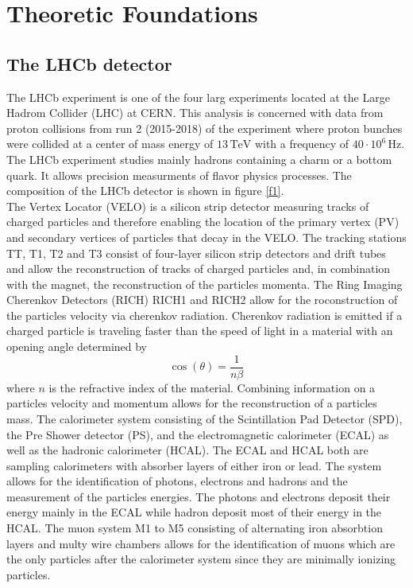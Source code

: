 \section{Theoretic Foundations}
\label{sec:Theorie}

\subsection{The LHCb detector}

The LHCb experiment is one of the four larg experiments located at the Large Hadrom Collider (LHC) at CERN. 
This analysis is concerned with data from proton collisions from run 2 (2015-2018) of the experiment where proton bunches were collided at 
a center of mass energy of $13 \, \si{\tera\eV}$ with a frequency of $40 \cdot 10^6 \, \si{\hertz}$. The LHCb experiment studies mainly hadrons 
containing a charm or a bottom quark. It allows precision measurments of flavor physics processes. 
The composition of the LHCb detector is shown in figure \ref{f1}. \\
The Vertex Locator (VELO) is a silicon strip detector measuring tracks of charged particles and therefore enabling the location of the 
primary vertex (PV) and secondary vertices of particles that decay in the VELO. The tracking stations TT, T1, T2 and T3 consist of four-layer silicon 
strip detectors and drift tubes and allow the reconstruction of tracks of charged particles and, in combination with the magnet, the reconstruction of the 
particles momenta.
The Ring Imaging Cherenkov Detectors (RICH) RICH1 and RICH2 allow for the roconstruction of the particles velocity via cherenkov radiation. 
Cherenkov radiation is emitted if a charged particle is traveling faster than the speed of light in a material with an opening angle determined by 
\begin{equation}
  \cos (\theta) = \frac{1}{n \beta}
\end{equation}
where $n$ is the refractive index of the material. 
Combining information on a particles velocity and momentum allows for the reconstruction of a particles mass. 
The calorimeter system consisting of the Scintillation Pad Detector (SPD), the Pre Shower detector (PS), and the electromagnetic calorimeter (ECAL) 
as well as the hadronic calorimeter (HCAL). The ECAL and HCAL both are sampling calorimeters with absorber layers of either iron or lead. 
The system allows for the identification of photons, electrons and hadrons and the measurement of the particles energies. The photons and electrons 
deposit their energy mainly in the ECAL while hadron deposit most of their energy in the HCAL.
The muon system M1 to M5 consisting of alternating iron absorbtion layers and multy wire chambers allows for the identification of muons which are 
the only particles after the calorimeter system since they are minimally ionizing particles.

